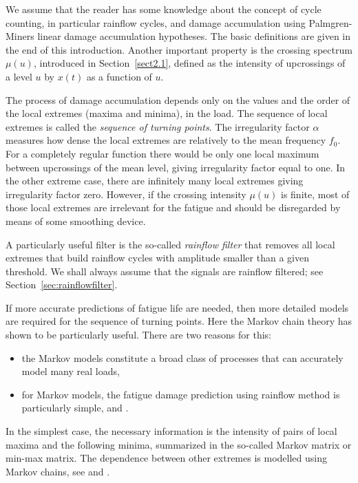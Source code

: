 We assume that the reader has some knowledge about the concept of
cycle counting, in particular rainflow cycles, and damage accumulation
using Palmgren-Miners linear damage accumulation hypotheses.
The basic definitions are given in the end of this introduction.
Another important property is the crossing spectrum $\mu(u)$, 
introduced in Section~\ref{sect2.1}, defined as the intensity of 
upcrossings of a level $u$ by $x(t)$ as a function of $u$.

The process of damage accumulation depends only on the values
and the order of the local extremes (maxima and minima),
in the load. The sequence 
of local extremes is called the \emph{sequence of turning points}.
The irregularity factor $\alpha$ 
measures how dense the local 
extremes are relatively to the mean frequency $f_0$.
For a completely regular function there would be only one
local maximum between upcrossings of the mean level, giving
irregularity factor equal to one. In the other extreme case,
there are infinitely many local extremes giving irregularity factor zero.
However, if the crossing intensity $\mu(u)$ is finite, most of those
local extremes are irrelevant for the fatigue and should be
disregarded by means of some smoothing device.

A particularly useful filter is the so-called {\em rainflow filter} 
that 
removes all local extremes that build rainflow cycles with amplitude
smaller than a given threshold. We shall always assume that the signals
are rainflow filtered; see Section~\ref{sec:rainflowfilter}.

If more accurate predictions of fatigue life are needed, then
more detailed models are required for the sequence of turning points.
Here the Markov chain theory has shown to be particularly useful.
There are two reasons for this:
\begin{itemize}
\item the Markov models constitute a broad
class of processes that can accurately model many real loads,
\item for Markov models, the fatigue damage prediction using rainflow method
is particularly simple, \cite{Rychlik1988Rainflow} and
\cite{Johannesson1999Rainflow}.
\end{itemize}
In the simplest case, the necessary
information is the intensity of pairs of local maxima and the following
minima, summarized in
the so-called Markov matrix or min-max matrix. The dependence
between other extremes is modelled using Markov chains,
see \cite{RychlikLindgrenLin1995} and \cite{FrendahlAndRychlik1993Rainflow}.

